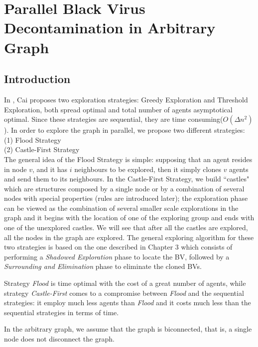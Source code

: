 \chapter {Parallel Black Virus Decontamination in Arbitrary Graph}
\label{TL}

\section{Introduction}
In \cite{cai}, Cai proposes two exploration strategies: Greedy Exploration and Threshold Exploration, both spread optimal and total number of agents asymptotical optimal. Since these strategies are sequential, they are time consuming($O(\Delta n^2)$).  In order to explore the graph in parallel, we propose two different strategies: \\
(1) Flood Strategy\\
(2) Castle-First Strategy\\
The general idea of the Flood Strategy is simple: supposing that an agent resides in node $v$, and it has $i$ neighbours  to be explored, then it simply clones $v$ agents and send them to its neighbours. In the Castle-First Strategy, we build ``castles" which are structures composed by  a single node or by a combination of several nodes with special properties (rules are introduced later); the exploration phase can be viewed as the combination of several smaller scale explorations in the graph and it begins with the location of one of the exploring group and ends with one of the unexplored castles. We will see that after all the castles are explored, all the nodes in the graph are explored. The general exploring algorithm for these two strategies is based on the one described in Chapter 3 which consists of performing a {\em Shadowed Exploration} phase to locate the BV, followed by a {\em Surrounding and Elimination} phase to eliminate the cloned BVs. 

Strategy {\em Flood}  is time optimal with the cost of a great number of agents,
 while strategy {\em Castle-First} comes to a compromise between  {\em Flood} and the sequential strategies: it employ much less agents than  {\em Flood} and it costs much less  than the sequential strategies in terms of time. 

In the arbitrary graph, we assume that the graph is biconnected, that is, a single node does not disconnect the graph.


